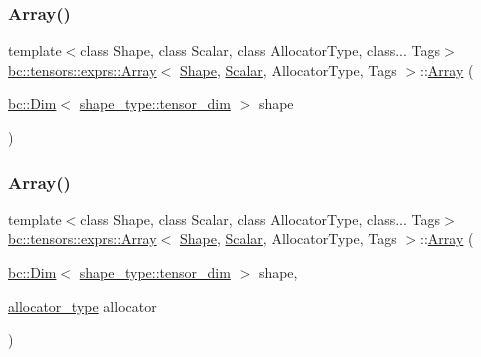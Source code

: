 \mbox{\label{structbc_1_1tensors_1_1exprs_1_1Array_a86801946a99e3d104ee7d6569c97072c}} 
\subsubsection{\texorpdfstring{Array()}{Array()}\hspace{0.1cm}{\footnotesize\ttfamily [4/9]}}
{\footnotesize\ttfamily template$<$class Shape, class Scalar, class Allocator\+Type, class... Tags$>$ \\
\hyperlink{structbc_1_1tensors_1_1exprs_1_1Array}{bc\+::tensors\+::exprs\+::\+Array}$<$ \hyperlink{structbc_1_1Shape}{Shape}, \hyperlink{namespacebc_aa12ac55ee2c43dc082894dd3859daee1}{Scalar}, Allocator\+Type, Tags $>$\+::\hyperlink{structbc_1_1tensors_1_1exprs_1_1Array}{Array} (\begin{DoxyParamCaption}\item[{\hyperlink{structbc_1_1Dim}{bc\+::\+Dim}$<$ \hyperlink{structbc_1_1Shape_a1f75fffa8b4aec4405025de308adb169}{shape\+\_\+type\+::tensor\+\_\+dim} $>$}]{shape }\end{DoxyParamCaption})\hspace{0.3cm}{\ttfamily [inline]}}

\mbox{\label{structbc_1_1tensors_1_1exprs_1_1Array_afdc66d4d061f95a91831044776e619a3}} 
\subsubsection{\texorpdfstring{Array()}{Array()}\hspace{0.1cm}{\footnotesize\ttfamily [5/9]}}
{\footnotesize\ttfamily template$<$class Shape, class Scalar, class Allocator\+Type, class... Tags$>$ \\
\hyperlink{structbc_1_1tensors_1_1exprs_1_1Array}{bc\+::tensors\+::exprs\+::\+Array}$<$ \hyperlink{structbc_1_1Shape}{Shape}, \hyperlink{namespacebc_aa12ac55ee2c43dc082894dd3859daee1}{Scalar}, Allocator\+Type, Tags $>$\+::\hyperlink{structbc_1_1tensors_1_1exprs_1_1Array}{Array} (\begin{DoxyParamCaption}\item[{\hyperlink{structbc_1_1Dim}{bc\+::\+Dim}$<$ \hyperlink{structbc_1_1Shape_a1f75fffa8b4aec4405025de308adb169}{shape\+\_\+type\+::tensor\+\_\+dim} $>$}]{shape,  }\item[{\hyperlink{structbc_1_1tensors_1_1exprs_1_1Array_a990afcebe8817075d427f2653d197140}{allocator\+\_\+type}}]{allocator }\end{DoxyParamCaption})\hspace{0.3cm}{\ttfamily [inline]}}

